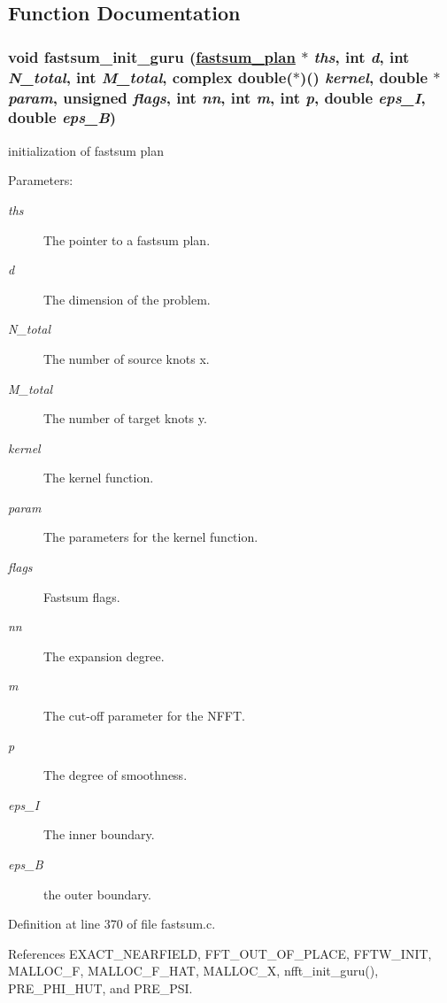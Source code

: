 \subsection{Function Documentation}
\hypertarget{group__applications__fastsum_ga13}{
\subsubsection[fastsum\_\-init\_\-guru]{\setlength{\rightskip}{0pt plus 5cm}void fastsum\_\-init\_\-guru (\hyperlink{structfastsum__plan__}{fastsum\_\-plan} $\ast$ {\em ths}, int {\em d}, int {\em N\_\-total}, int {\em M\_\-total}, complex double($\ast$)() {\em kernel}, double $\ast$ {\em param}, unsigned {\em flags}, int {\em nn}, int {\em m}, int {\em p}, double {\em eps\_\-I}, double {\em eps\_\-B})}}
\label{group__applications__fastsum_ga13}


initialization of fastsum plan 

\begin{Desc}
\item[Parameters:]
\begin{description}
\item[{\em ths}]The pointer to a fastsum plan. \item[{\em d}]The dimension of the problem. \item[{\em N\_\-total}]The number of source knots x. \item[{\em M\_\-total}]The number of target knots y. \item[{\em kernel}]The kernel function. \item[{\em param}]The parameters for the kernel function. \item[{\em flags}]Fastsum flags. \item[{\em nn}]The expansion degree. \item[{\em m}]The cut-off parameter for the NFFT. \item[{\em p}]The degree of smoothness. \item[{\em eps\_\-I}]The inner boundary. \item[{\em eps\_\-B}]the outer boundary. \end{description}
\end{Desc}


Definition at line 370 of file fastsum.c.

References EXACT\_\-NEARFIELD, FFT\_\-OUT\_\-OF\_\-PLACE, FFTW\_\-INIT, MALLOC\_\-F, MALLOC\_\-F\_\-HAT, MALLOC\_\-X, nfft\_\-init\_\-guru(), PRE\_\-PHI\_\-HUT, and PRE\_\-PSI.

